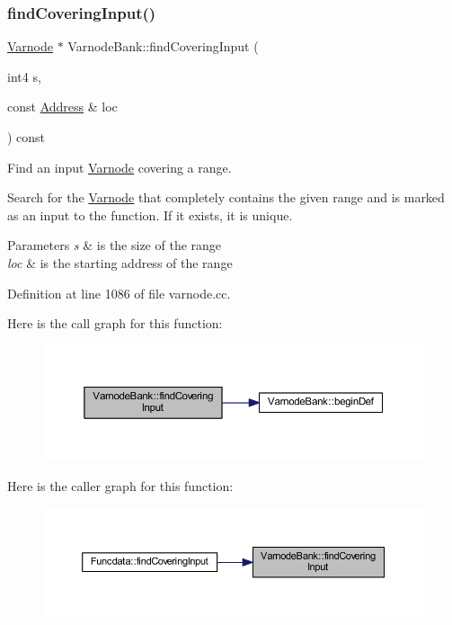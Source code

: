 \subsubsection{\texorpdfstring{findCoveringInput()}{findCoveringInput()}}
{\footnotesize\ttfamily \mbox{\hyperlink{class_varnode}{Varnode}} $\ast$ Varnode\+Bank\+::find\+Covering\+Input (\begin{DoxyParamCaption}\item[{int4}]{s,  }\item[{const \mbox{\hyperlink{class_address}{Address}} \&}]{loc }\end{DoxyParamCaption}) const}



Find an input \mbox{\hyperlink{class_varnode}{Varnode}} covering a range. 

Search for the \mbox{\hyperlink{class_varnode}{Varnode}} that completely contains the given range and is marked as an input to the function. If it exists, it is unique. 
\begin{DoxyParams}{Parameters}
{\em s} & is the size of the range \\
\hline
{\em loc} & is the starting address of the range \\
\hline
\end{DoxyParams}


Definition at line 1086 of file varnode.\+cc.

Here is the call graph for this function\+:
\nopagebreak
\begin{figure}[H]
\begin{center}
\leavevmode
\includegraphics[width=350pt]{class_varnode_bank_ae582ca41dcfbcb24895320c371113052_cgraph}
\end{center}
\end{figure}
Here is the caller graph for this function\+:
\nopagebreak
\begin{figure}[H]
\begin{center}
\leavevmode
\includegraphics[width=350pt]{class_varnode_bank_ae582ca41dcfbcb24895320c371113052_icgraph}
\end{center}
\end{figure}
\mbox{\label{class_varnode_bank_a5375b59862f62539df76d67de60414c6}} 
